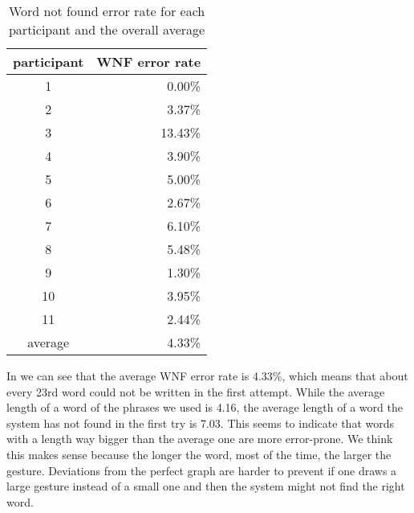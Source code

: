 \iffalse
\begin{figure}[H]
    \makebox[\textwidth][c]{
        \centering
        \subbottom[with characters\label{fig:error_system:error_system1}]{\texttt{[image: system\_error2\_1.png]}}\hspace{-3.0em}
        \subbottom[with words\label{fig:error_system:error_system2}]{\texttt{[image: system\_error2\_2.png]}}
    }
    \caption{percentage of characters/words that were not found by the system neither as best match nor as suggestion}
    \label{fig:error_system}
\end{figure}
\begin{figure}[H]
    \centering
    \texttt{[image: system\_error2\_2.pdf]}
    \caption{percentage of words that were not found by the system neither as best match nor as suggestion}
    \label{fig:error_system}
\end{figure}
\fi
\begin{table}[H]
    \centering
    \caption{Word not found error rate for each participant and the overall average}
    \begin{tabular}{cr} \toprule
        participant&WNF error rate\\ \midrule
        1&0.00\%\\
        2&3.37\%\\
        3&13.43\%\\
        4&3.90\%\\
        5&5.00\%\\
        6&2.67\%\\
        7&6.10\%\\
        8&5.48\%\\
        9&1.30\%\\
        10&3.95\%\\
        11&2.44\%\\\midrule
        average&4.33\%\\
        \bottomrule
    \end{tabular}
    \label{tab:wnf_er}
\end{table}
In  we can see that the average WNF error rate is 4.33\%, which means that about every 23rd word could not be written in the first attempt. While the average length of a word of the phrases we used is 4.16, the average length of a word the system has not found in the first try is 7.03. This seems to indicate that words with a length way bigger than the average one are more error-prone. We think this makes sense because the longer the word, most of the time, the larger the gesture. Deviations from the perfect graph are harder to prevent if one draws a large gesture instead of a small one and then the system might not find the right word.
